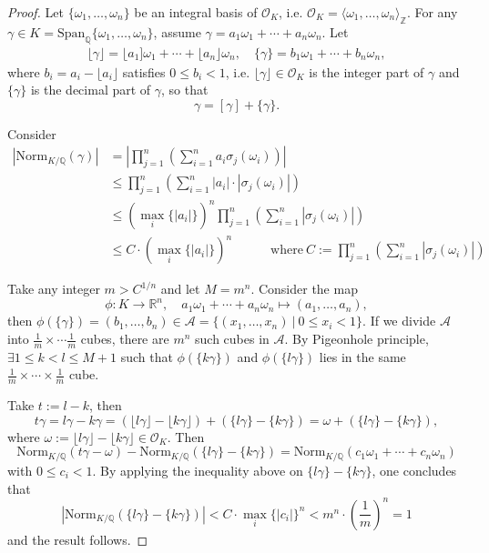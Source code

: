 \documentclass[11pt]{book}
\begin{document}
\begin{proof}
    Let $\{\omega_{1},\dots, \omega_{n}\}$ be an integral basis of $\mathcal{O}_{K}$, i.e. $\mathcal{O}_{K}=\langle \omega_{1},\dots, \omega_{n}\rangle_{\mathbb{Z}}$. For any $\gamma\in K=\mathrm{Span}_{\mathbb{Q}}\{\omega_{1},\dots, \omega_{n}\}$, assume $\gamma=a_{1}\omega_{1}+\cdots+a_{n}\omega_{n}$. Let 
    \begin{align*}
    \lfloor \gamma \rfloor =\lfloor a_{1}]\omega_{1}+\cdots+\lfloor a_{n} \rfloor \omega_{n}, \quad \{\gamma\}=b_{1}\omega_{1}+\cdots+b_{n}\omega_{n},
    \end{align*}
    where $b_{i}=a_{i}-\lfloor a_{i}\rfloor $ satisfies $0\leq b_{i}<1$, i.e. $\lfloor \gamma \rfloor \in \mathcal{O}_K$ is the integer part of $\gamma$ and $\{\gamma\}$ is the decimal part of $\gamma$, so that $$\gamma=[\gamma]+\{\gamma\}.$$

    \medskip
    Consider
    \[ 
    \begin{aligned}
    \left| \mathrm{Norm}_{K /\mathbb{Q}}(\gamma) \right| &=\left| \prod_{j=1}^{n}(\sum_{i=1}^{n}a_{i}\sigma_{j}(\omega_{i})) \right|\\
    &\leq \prod_{j=1}^{n}(\sum_{i=1}^{n}\left| a_{i} \right| \cdot \left| \sigma_{j}(\omega_{i}) \right| )\\
    &\leq (\max_{i}\{\left| a_{i} \right|\})^{n}\prod_{j=1}^{n}(\sum_{i=1}^{n}\left| \sigma_{j}(\omega_{i}) \right|) \\
    & \leq C\cdot (\max_{i}\{\left| a_{i} \right| \})^{n}  \quad \quad \quad \text{where}\ \displaystyle C:=\prod_{j=1}^{n}(\sum_{i=1}^{n}\left| \sigma_{j}(\omega_{i}) \right| )
    \end{aligned}
    \]
     
    
    Take any integer $m>C^{1 /n}$ and let $M=m^{n}$. Consider the map 
    \[\phi:K\to \mathbb{R}^{n},\quad a_{1}\omega_{1}+\cdots+a_{n}\omega_{n}\mapsto (a_{1},\dots, a_{n}),\]
    then $\phi(\{\gamma\})=(b_{1},\dots,b_{n})\in \mathscr{A}=\{(x_{1},\dots, x_{n})\ |\ 0\leq x_{i}<1\}$. If we divide $\mathscr{A}$ into $\frac{1}{m}\times \cdots \frac{1}{m}$ cubes, there are $m^{n}$ such cubes in $\mathscr{A}$. By Pigeonhole principle, $\exists 1\leq k<l\leq M+1$ such that $\phi(\{k\gamma\})$ and $\phi(\{l\gamma\})$ lies in the same $\frac{1}{m}\times\cdots\times \frac{1}{m}$ cube. 
    
    Take $t:=l-k$, then 
    $$t\gamma=l\gamma-k\gamma=(\lfloor l\gamma\rfloor-\lfloor k\gamma\rfloor)+(\{l\gamma\}-\{k\gamma\}) =\omega + (\{l\gamma\}-\{k\gamma\}),$$ 
    where $\omega:=\lfloor l\gamma \rfloor -\lfloor k\gamma\rfloor \in \mathcal{O}_K$. Then
    \[
    \mathrm{Norm}_{K/\mathbb{Q}}(t\gamma-\omega)-\mathrm{Norm}_{K /\mathbb{Q}}(\{l\gamma\}-\{k\gamma\})=\mathrm{Norm}_{K /\mathbb{Q}}(c_{1}\omega_{1}+\cdots+c_{n}\omega_{n}) 
    \]
    with $0\leq c_{i}< 1$. By applying the inequality above on $\{l\gamma\}-\{k\gamma\}$, one concludes that
    \[\left| \mathrm{Norm}_{K /\mathbb{Q}}(\{l\gamma\}-\{k\gamma\}) \right| <C\cdot \max_{i}\{\left| c_{i} \right| \}^{n}<m^{n}\cdot (\frac{1}{m})^{n}=1 \]
    and the result follows.
\end{proof}
\end{document}
